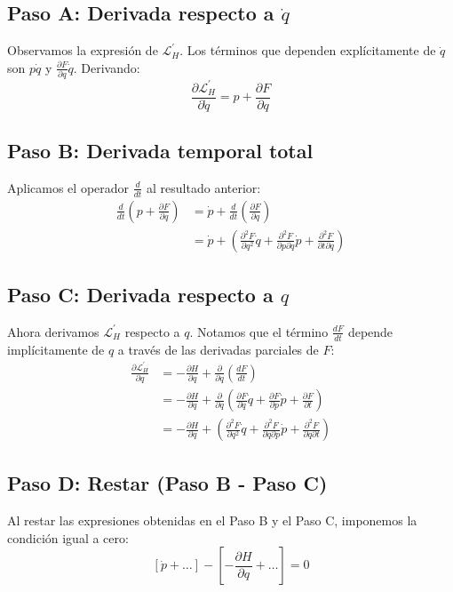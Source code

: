 \documentclass[12pt, a4paper]{article}
\begin{document}
\subsection*{Paso A: Derivada respecto a $\dot{q}$}
Observamos la expresión de $\mathcal{L}_{H}^{\prime}$. Los términos que dependen explícitamente de $\dot{q}$ son $p\dot{q}$ y $\frac{\partial F}{\partial q}\dot{q}$. Derivando:
\begin{equation}
    \frac{\partial \mathcal{L}_{H}^{\prime}}{\partial \dot{q}} = p + \frac{\partial F}{\partial q}
\end{equation}

\subsection*{Paso B: Derivada temporal total}
Aplicamos el operador $\frac{d}{dt}$ al resultado anterior:
\begin{align}
    \frac{d}{dt}\left( p + \frac{\partial F}{\partial q} \right) &= \dot{p} + \frac{d}{dt}\left( \frac{\partial F}{\partial q} \right) \nonumber \\
    &= \dot{p} + \left( \frac{\partial^2 F}{\partial q^2}\dot{q} + \frac{\partial^2 F}{\partial p \partial q}\dot{p} + \frac{\partial^2 F}{\partial t \partial q} \right)
\end{align}

\subsection*{Paso C: Derivada respecto a $q$}
Ahora derivamos $\mathcal{L}_{H}^{\prime}$ respecto a $q$. Notamos que el término $\frac{dF}{dt}$ depende implícitamente de $q$ a través de las derivadas parciales de $F$:
\begin{align}
    \frac{\partial \mathcal{L}_{H}^{\prime}}{\partial q} &= -\frac{\partial H}{\partial q} + \frac{\partial}{\partial q}\left( \frac{dF}{dt} \right) \nonumber \\
    &= -\frac{\partial H}{\partial q} + \frac{\partial}{\partial q}\left( \frac{\partial F}{\partial q}\dot{q} + \frac{\partial F}{\partial p}\dot{p} + \frac{\partial F}{\partial t} \right) \nonumber \\
    &= -\frac{\partial H}{\partial q} + \left( \frac{\partial^2 F}{\partial q^2}\dot{q} + \frac{\partial^2 F}{\partial q \partial p}\dot{p} + \frac{\partial^2 F}{\partial q \partial t} \right)
\end{align}

\subsection*{Paso D: Restar (Paso B - Paso C)}
Al restar las expresiones obtenidas en el Paso B y el Paso C, imponemos la condición igual a cero:
\begin{equation}
    \left[ \dot{p} + \dots \right] - \left[ -\frac{\partial H}{\partial q} + \dots \right] = 0
\end{equation}
\end{document}
